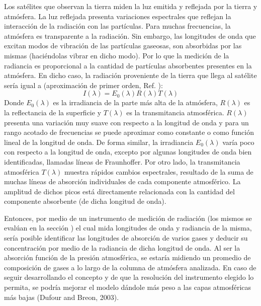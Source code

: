 \documentclass[11pt,titlepage]{article}
\begin{document}
% 
Los satélites que observan la tierra miden la luz emitida y reflejada por la tierra y atmósfera. La luz reflejada presenta variaciones espectrales que reflejan la interacción de la radiación con las partículas. Para muchas frecuencias, la atmósfera es transparente a la radiación. Sin embargo, las longitudes de onda que excitan modos de vibración de las partículas gaseosas, son absorbidas por las mismas (haciéndolas vibrar en dicho modo). Por lo que la medición de la radiancia %
es proporcional a la cantidad de partículas absorbentes presentes en la atmósfera. En dicho caso, la radiación proveniente de la tierra que llega al satélite sería igual a (aproximación de primer orden, Ref. \cite{spaceborn_sensing}):
\begin{equation}
    I(\lambda)=E_{0}(\lambda) R(\lambda) T(\lambda)
\end{equation}
Donde $E_{0}(\lambda)$ es la irradiancia de la parte más alta de la atmósfera, $R(\lambda)$ es la reflectancia de la superficie y $ T(\lambda)$ es la transmitancia atmosférica. $R(\lambda)$ presenta una variación muy suave con respecto a la longitud de onda y para un rango acotado de frecuencias se puede aproximar como constante o como función lineal de la longitud de onda. De forma similar, la irradiancia $E_{0}(\lambda)$ varía poco con respecto a la longitud de onda, excepto por algunas longitudes de onda bien identificadas, llamadas líneas de Fraunhoffer. Por otro lado, la transmitancia atmosférica $T(\lambda)$ muestra rápidos cambios espectrales, resultado de la suma de muchas líneas de absorción individuales de cada componente atmosférico. La amplitud de dichos picos está directamente relacionada con la cantidad del componente absorbente (de dicha longitud de onda).\par
Entonces, por medio de un instrumento de medici\'on de radiación (los mismos se evalúan en la sección )  el cual mida longitudes de onda y radiancia de la misma, sería posible identificar las longitudes de absorción de varios gases  y deducir su concentración por medio de la radiancia de dicha longitud de onda. Al ser la absorción función de la presión atmosférica, se estaría midiendo un promedio de composición de gases a lo largo de la columna de atmósfera analizada. En caso de seguir desarrollando el concepto y de que la resolución del instrumento elegido lo permita, se podría mejorar el modelo dándole más peso a las capas atmosféricas más bajas (Dufour and Breon, 2003).\par 
\end{document}
